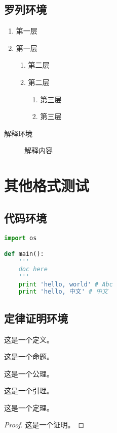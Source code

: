 \section{罗列环境}

\begin{enumerate}
    \item 第一层\label{item:1}
    \item 第一层
    \begin{enumerate}
        \item 第二层\label{item:2}
        \item 第二层
        \begin{enumerate}
            \item 第三层\label{item:3}
            \item 第三层
        \end{enumerate}
    \end{enumerate}
\end{enumerate}

\begin{description}
    \item[解释环境]  解释内容
\end{description}

\chapter{其他格式测试}

\section{代码环境}

\begin{lstlisting}[language=python]
import os

def main():
    '''
    doc here
    '''
    print 'hello, world' # Abc
    print 'hello, 中文' # 中文
\end{lstlisting}

\section{定律证明环境}

\begin{definition}\label{def:1}
这是一个定义。
\end{definition}
\begin{proposition}\label{proposition:1}
这是一个命题。
\end{proposition}
\begin{axiom}\label{axiom:1}
这是一个公理。
\end{axiom}
\begin{lemma}\label{lemma:1}
这是一个引理。
\end{lemma}
\begin{theorem}\label{theorem:1}
这是一个定理。
\end{theorem}
\begin{proof}\label{proof:1}
这是一个证明。
\end{proof}

